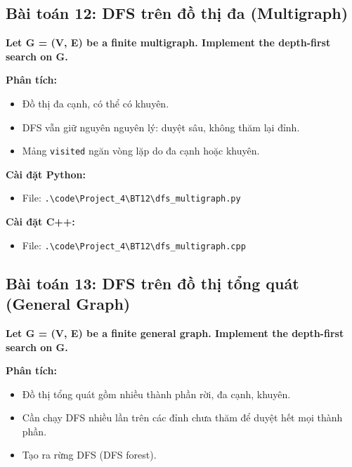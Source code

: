 \documentclass[12pt,a4paper]{article}
\begin{document}
\subsection{Bài toán 12: DFS trên đồ thị đa (Multigraph)}

\begin{problembox}
    \textbf{Let G = (V, E) be a finite multigraph. Implement the depth-first search on G.} 
\end{problembox}

\textbf{Phân tích:}
\begin{itemize}[label=\textbullet]
    \item Đồ thị đa cạnh, có thể có khuyên.
    \item DFS vẫn giữ nguyên nguyên lý: duyệt sâu, không thăm lại đỉnh.
    \item Mảng \texttt{visited} ngăn vòng lặp do đa cạnh hoặc khuyên.
\end{itemize}

\textbf{Cài đặt Python:}
\begin{itemize}[label=\textbullet]
   \item File: \texttt{.\textbackslash code\textbackslash Project\_4\textbackslash BT12\textbackslash dfs\_multigraph.py}
\end{itemize}

\textbf{Cài đặt C++:}
\begin{itemize}[label=\textbullet]
   \item File: \texttt{.\textbackslash code\textbackslash Project\_4\textbackslash BT12\textbackslash dfs\_multigraph.cpp}
\end{itemize}


\subsection{Bài toán 13: DFS trên đồ thị tổng quát (General Graph)}

\begin{problembox}
    \textbf{Let G = (V, E) be a finite general graph. Implement the depth-first search on G.} 
\end{problembox}

\textbf{Phân tích:}
\begin{itemize}[label=\textbullet]
    \item Đồ thị tổng quát gồm nhiều thành phần rời, đa cạnh, khuyên.
    \item Cần chạy DFS nhiều lần trên các đỉnh chưa thăm để duyệt hết mọi thành phần.
    \item Tạo ra rừng DFS (DFS forest).
\end{itemize}
\end{document}
